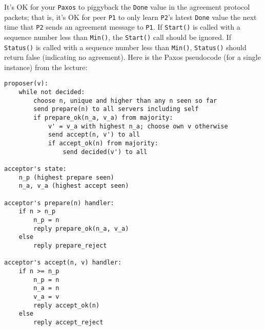 \documentclass{article}
\newcommand{\code}{\texttt}
\begin{document}
It's OK for your \code{Paxos} to piggyback the \code{Done} value in the agreement
protocol packets; that is, it's OK for peer \code{P1} to only learn \code{P2}'s latest
\code{Done} value the next time that \code{P2} sends an agreement message to \code{P1}.
If \code{Start()} is called with a sequence number less than \code{Min()}, the \code{Start()}
call should be ignored. If \code{Status()} is called with a sequence number less
than \code{Min()}, \code{Status()} should return false (indicating no agreement).
Here is the Paxos pseudocode (for a single instance) from the lecture:

\newpage

\begin{lstlisting}
proposer(v):
    while not decided:
        choose n, unique and higher than any n seen so far
        send prepare(n) to all servers including self
        if prepare_ok(n_a, v_a) from majority:
            v' = v_a with highest n_a; choose own v otherwise
            send accept(n, v') to all
            if accept_ok(n) from majority:
                send decided(v') to all

acceptor's state:
    n_p (highest prepare seen)
    n_a, v_a (highest accept seen)

acceptor's prepare(n) handler:
    if n > n_p
        n_p = n
        reply prepare_ok(n_a, v_a)
    else
        reply prepare_reject

acceptor's accept(n, v) handler:
    if n >= n_p
        n_p = n
        n_a = n
        v_a = v
        reply accept_ok(n)
    else
        reply accept_reject
\end{lstlisting}
\end{document}
